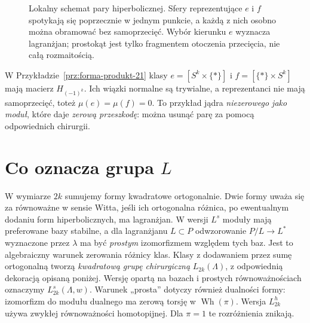 \begin{figure}[htbp]
\centering
{}
\caption{Lokalny schemat pary hiperbolicznej.
Sfery reprezentujące $e$ i $f$ spotykają się poprzecznie
w jednym punkcie, a każdą z nich osobno można
obramować bez samoprzecięć. Wybór kierunku $e$
wyznacza lagranżjan; prostokąt jest tylko fragmentem
otoczenia przecięcia, nie całą rozmaitością.}
\label{fig:hiperboliczna-22}
\end{figure}

\begin{przyklad}
\label{prz:produkt-L-22}
W Przykładzie~\ref{prz:forma-produkt-21}
klasy $e=[S^k\times\{*\}]$ i
$f=[\{*\}\times S^k]$ mają macierz $H_{(-1)^k}$.
Ich wiązki normalne są trywialne, a reprezentanci
nie mają samoprzecięć, toteż $\mu(e)=\mu(f)=0$.
To przykład jądra \emph{niezerowego jako moduł},
które daje \emph{zerową przeszkodę}:
można usunąć parę za pomocą odpowiednich chirurgii.
\end{przyklad}

\section{Co oznacza grupa \texorpdfstring{$L$}{L}}
\label{sec:grupy-L-22}

W wymiarze $2k$ sumujemy formy kwadratowe
ortogonalnie. Dwie formy uważa się za równoważne
w sensie Witta, jeśli ich ortogonalna różnica,
po ewentualnym dodaniu form hiperbolicznych,
ma lagranżjan. W wersji $L^s$ moduły mają
preferowane bazy stabilne, a dla lagranżjanu
$L\subset P$ odwzorowanie $P/L\to L^*$
wyznaczone przez $\lambda$ ma być \emph{prostym}
izomorfizmem względem tych baz. Jest to algebraiczny warunek
zerowania różnicy klas. Klasy z dodawaniem
przez sumę ortogonalną tworzą \emph{kwadratową grupę
chirurgiczną} $L_{2k}(\Lambda)$, z odpowiednią
dekoracją opisaną poniżej. Wersję opartą na bazach
i prostych równoważnościach oznaczymy
$L^s_{2k}(\Lambda,w)$. Warunek „prosta” dotyczy
również dualności formy: izomorfizm do modułu dualnego
ma zerową torsję w $\operatorname{Wh}(\pi)$.
Wersja $L^h_{2k}$ używa zwykłej równoważności
homotopijnej. Dla $\pi=1$ te rozróżnienia znikają.

